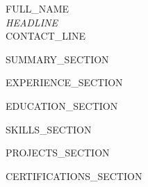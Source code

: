 \documentclass[a4paper,10pt]{article}
\begin{document}
\begin{center}
    {\Huge \scshape {{FULL_NAME}}} \\ \vspace{2pt}
    {\large \textit{{{HEADLINE}}}} \\ \vspace{3pt}
    \small {{CONTACT_LINE}}
\end{center}
\vspace{-8pt}

{{SUMMARY_SECTION}}

{{EXPERIENCE_SECTION}}

{{EDUCATION_SECTION}}

{{SKILLS_SECTION}}

{{PROJECTS_SECTION}}

{{CERTIFICATIONS_SECTION}}
\end{document}
